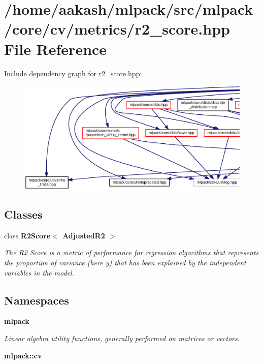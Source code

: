 \section{/home/aakash/mlpack/src/mlpack/core/cv/metrics/r2\+\_\+score.hpp File Reference}
\label{r2__score_8hpp}
Include dependency graph for r2\+\_\+score.\+hpp\+:
\nopagebreak
\begin{figure}[H]
\begin{center}
\leavevmode
\includegraphics[width=350pt]{r2__score_8hpp__incl}
\end{center}
\end{figure}
\subsection*{Classes}
\begin{DoxyCompactItemize}
\item 
class \textbf{ R2\+Score$<$ Adjusted\+R2 $>$}
\begin{DoxyCompactList}\small\item\em The R2 Score is a metric of performance for regression algorithms that represents the proportion of variance (here y) that has been explained by the independent variables in the model. \end{DoxyCompactList}\end{DoxyCompactItemize}
\subsection*{Namespaces}
\begin{DoxyCompactItemize}
\item 
 \textbf{ mlpack}
\begin{DoxyCompactList}\small\item\em Linear algebra utility functions, generally performed on matrices or vectors. \end{DoxyCompactList}\item 
 \textbf{ mlpack\+::cv}
\end{DoxyCompactItemize}


